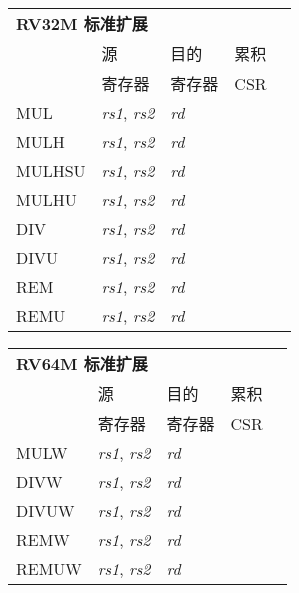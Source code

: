 \begin{tabular}{p{3cm}|p{3cm}|p{2cm}|p{4cm}|p{4cm}}
  \multicolumn{4}{l}{\bf RV32M 标准扩展} \\
  \cline{2-4}
    & 源    & 目的 & 累积 \\
    & 寄存器 & 寄存器   & CSR \\
  \cline{2-4}
   MUL & {\em rs1}, {\em rs2} & {\em rd} &   & \\
   \cline{2-4}
   MULH & {\em rs1}, {\em rs2} & {\em rd} &   & \\
   \cline{2-4}
   MULHSU & {\em rs1}, {\em rs2} & {\em rd} &   & \\
   \cline{2-4}
   MULHU & {\em rs1}, {\em rs2} & {\em rd} &   & \\
   \cline{2-4}
   DIV & {\em rs1}, {\em rs2} & {\em rd} &   & \\
   \cline{2-4}
   DIVU & {\em rs1}, {\em rs2} & {\em rd} &   & \\
   \cline{2-4}
   REM & {\em rs1}, {\em rs2} & {\em rd} &   & \\
   \cline{2-4}
   REMU & {\em rs1}, {\em rs2} & {\em rd} &   & \\
   \cline{2-4}
\end{tabular}

\begin{tabular}{p{3cm}|p{3cm}|p{2cm}|p{4cm}|p{4cm}}
  \multicolumn{4}{l}{\bf RV64M 标准扩展} \\
  \cline{2-4}
    & 源    & 目的 & 累积 \\
    & 寄存器 & 寄存器   & CSR \\
  \cline{2-4}
   MULW & {\em rs1}, {\em rs2} & {\em rd} &   & \\
   \cline{2-4}
   DIVW & {\em rs1}, {\em rs2} & {\em rd} &   & \\
   \cline{2-4}
   DIVUW & {\em rs1}, {\em rs2} & {\em rd} &   & \\
   \cline{2-4}
   REMW & {\em rs1}, {\em rs2} & {\em rd} &   & \\
   \cline{2-4}
   REMUW & {\em rs1}, {\em rs2} & {\em rd} &   & \\
   \cline{2-4}
\end{tabular}

